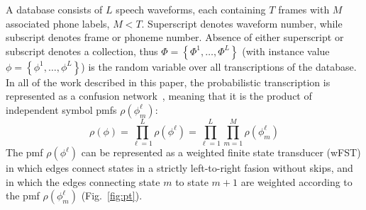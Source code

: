 A database consists of $L$ speech waveforms, each containing $T$
frames with $M$ associated phone labels, $M<T$.  Superscript denotes
waveform number, while subscript denotes frame or phoneme number.
Absence of either superscript or subscript denotes a collection, thus
$\Phi=\left\{\Phi^1,\ldots,\Phi^L\right\}$ (with instance value
$\phi=\left\{\phi^1,\ldots,\phi^L\right\}$) is the random variable
over all transcriptions of the database.  In all of the work described
in this paper, the probabilistic transcription is represented as a
confusion network~\cite{Mangu00}, meaning that it is the product of
independent symbol pmfs $\rho(\phi_m^\ell)$:
\begin{equation}
  \rho(\phi)=\prod_{\ell=1}^L\rho(\phi^\ell)=
  \prod_{\ell=1}^L \prod_{m=1}^M \rho(\phi_m^{\ell})
\end{equation}
The pmf $\rho(\phi^\ell)$ can be represented as a weighted
finite state transducer (wFST) in which edges connect states in a
strictly left-to-right fasion without skips, and in which the edges
connecting state $m$ to state $m+1$ are weighted according to the pmf
$\rho(\phi_m^\ell)$ (Fig.~\ref{fig:pt}).

